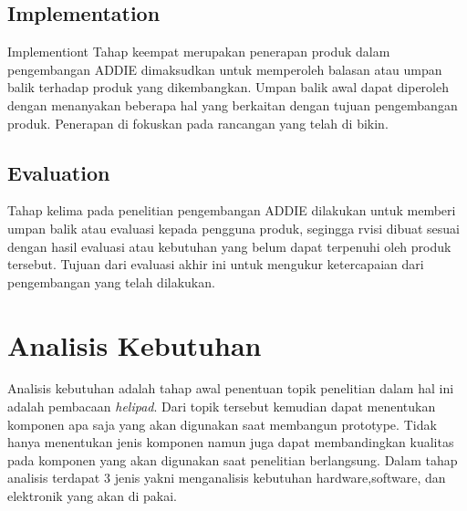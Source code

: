 \subsection{Implementation}
Implementiont Tahap keempat merupakan penerapan produk dalam pengembangan ADDIE dimaksudkan untuk memperoleh balasan atau umpan balik terhadap produk yang dikembangkan. Umpan balik awal dapat diperoleh dengan menanyakan beberapa hal yang berkaitan dengan tujuan pengembangan produk. Penerapan di fokuskan pada rancangan yang telah di bikin.
\subsection{Evaluation}
Tahap kelima pada penelitian pengembangan ADDIE dilakukan untuk memberi umpan balik atau evaluasi kepada pengguna produk, segingga rvisi dibuat sesuai dengan hasil evaluasi atau kebutuhan yang belum dapat terpenuhi oleh produk tersebut. Tujuan dari evaluasi akhir ini untuk mengukur ketercapaian dari pengembangan yang telah dilakukan.

\section{Analisis Kebutuhan}
Analisis kebutuhan adalah tahap awal penentuan topik penelitian dalam hal ini adalah pembacaan \textit{helipad}. Dari topik tersebut kemudian dapat menentukan komponen apa saja yang akan digunakan saat membangun prototype. Tidak hanya menentukan jenis komponen namun juga dapat membandingkan kualitas pada komponen yang akan digunakan saat penelitian berlangsung. Dalam tahap analisis terdapat 3 jenis yakni menganalisis kebutuhan hardware,software, dan elektronik yang akan di pakai.

